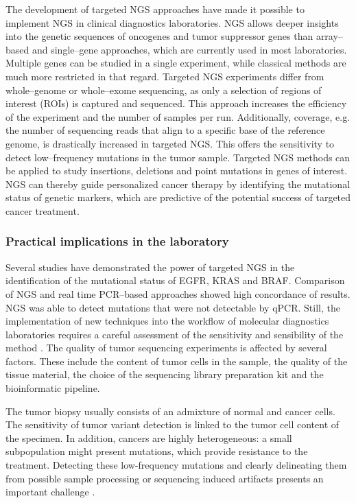 {{{    The development of targeted NGS approaches have made it possible to
    implement NGS in clinical diagnostics laboratories. NGS allows deeper
    insights into the genetic sequences of oncogenes and tumor suppressor
    genes than array--based and single--gene approaches, which are currently
    used in most laboratories. Multiple genes can be studied in a single
    experiment, while classical methods are much more restricted in that
    regard. Targeted NGS experiments differ from whole--genome or whole--exome
    sequencing, as only a selection of regions of interest (ROIs) is captured
    and sequenced. This approach increases the efficiency of the experiment
    and the number of samples per run. Additionally, coverage, e.g. the number
    of sequencing reads that align to a specific base of the reference genome,
    is drastically increased in targeted NGS. This offers the sensitivity to
    detect low--frequency mutations in the tumor sample. Targeted NGS methods
    can be applied to study insertions, deletions and point mutations in genes
    of interest. NGS can thereby guide personalized cancer therapy by
    identifying the mutational status of genetic markers, which are predictive
    of the potential success of targeted cancer treatment.

    \subsubsection{Practical implications in the laboratory}

      Several studies have demonstrated the power of targeted NGS in the
      identification of the mutational status of EGFR, KRAS and BRAF. Comparison
      of NGS and real time PCR--based approaches showed high concordance of
      results. NGS was able to detect mutations that were not detectable by
      qPCR. Still, the implementation of new techniques into the workflow of molecular
      diagnostics laboratories requires a careful assessment of the sensitivity
      and sensibility of the method {\cite{implementation}}. The quality of tumor sequencing
      experiments is affected by several factors. These include the content of
      tumor cells in the sample, the quality of the tissue material, the choice
      of the sequencing library preparation kit and the bioinformatic pipeline.

      The tumor biopsy usually consists of an admixture of normal and cancer
      cells. The sensitivity of tumor variant detection is linked to the tumor
      cell content of the specimen. In addition, cancers are highly
      heterogeneous: a small subpopulation might present mutations, which
      provide resistance to the treatment. Detecting these low-frequency
      mutations and clearly delineating them from possible sample processing or
      sequencing induced artifacts presents an important challenge {\cite{ffpe_ngs}}.

}}}
